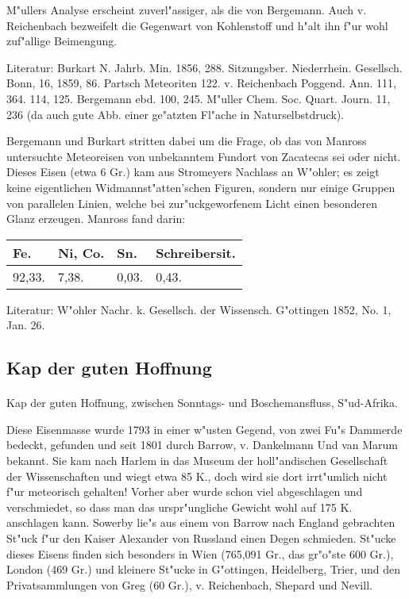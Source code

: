 \documentclass[a4paper, 11pt, oneside]{article}
\begin{document}
M"ullers Analyse erscheint zuverl"assiger, als die von Bergemann. Auch v. Reichenbach bezweifelt die Gegenwart von Kohlenstoff und h"alt ihn f"ur wohl zuf"allige Beimengung.

\footnotesize
Literatur: Burkart N. Jahrb. Min. 1856, 288. Sitzungsber. Niederrhein. Gesellsch. Bonn, 16, 1859, 86. Partsch Meteoriten 122. v. Reichenbach Poggend. Ann. 111, 364. 114, 125. Bergemann ebd. 100, 245. M"uller Chem. Soc. Quart. Journ. 11, 236 (da auch gute Abb. einer ge"atzten Fl"ache in Naturselbstdruck).

\normalsize
Bergemann und Burkart stritten dabei um die Frage, ob das von Manross untersuchte Meteoreisen von unbekanntem Fundort von Zacatecas sei oder nicht. Dieses Eisen (etwa 6 Gr.) kam aus Stromeyers Nachlass an W"ohler; es zeigt keine eigentlichen Widmannst"atten'schen Figuren, sondern nur einige Gruppen von parallelen Linien, welche bei zur"uckgeworfenem Licht einen besonderen Glanz erzeugen. Manross fand darin:
\begin{table}[H]
    \centering
    \begin{tabular}{l l l l}
        Fe. & Ni, Co. & Sn. & Schreibersit. \\ \hline
        92,33. & 7,38. & 0,03. & 0,43. \\
    \end{tabular}
\end{table}

\footnotesize
Literatur: W"ohler Nachr. k. Gesellsch. der Wissensch. G"ottingen 1852, No. 1, Jan. 26.

\subsection{Kap der guten Hoffnung}
\normalsize
\paragraph{}
Kap der guten Hoffnung, zwischen Sonntags- und Boschemansfluss, S"ud-Afrika.

Diese Eisenmasse wurde 1793 in einer w"usten Gegend, von zwei Fu"s Dammerde bedeckt, gefunden und seit 1801 durch Barrow, v. Dankelmann Und van Marum bekannt. Sie kam nach Harlem in das Museum der holl"andischen Gesellschaft der Wissenschaften und wiegt etwa 85 K., doch wird sie dort irrt"umlich nicht f"ur meteorisch gehalten! Vorher aber wurde schon viel abgeschlagen und verschmiedet, so dass man das urspr"ungliche Gewicht wohl auf 175 K. anschlagen kann. Sowerby lie"s aus einem von Barrow nach England gebrachten St"uck f"ur den Kaiser Alexander von Russland einen Degen schmieden. St"ucke dieses Eisens finden sich besonders in Wien (765,091 Gr., das gr"o"ste 600 Gr.), London (469 Gr.) und kleinere St"ucke in G"ottingen, Heidelberg, Trier, und den Privatsammlungen von Greg (60 Gr.), v. Reichenbach, Shepard und Nevill.
\end{document}
